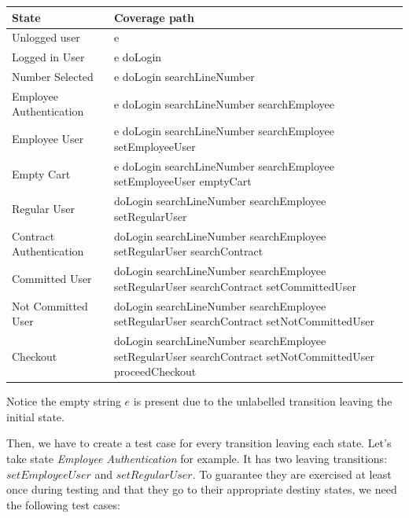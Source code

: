\begin{center}
\begin{tabular}{| l | p{10cm}|}

\hline

State & Coverage path \\ \hline

Unlogged user & e \\ \hline

Logged in User & e doLogin\\ \hline 

Number Selected & e doLogin searchLineNumber\\ \hline

Employee Authentication & e doLogin searchLineNumber searchEmployee\\ \hline

Employee User & e doLogin searchLineNumber searchEmployee setEmployeeUser \\ \hline

Empty Cart & e doLogin searchLineNumber searchEmployee setEmployeeUser emptyCart \\ \hline

Regular User & doLogin searchLineNumber searchEmployee setRegularUser \\ \hline

Contract Authentication & doLogin searchLineNumber searchEmployee setRegularUser searchContract \\ \hline

Committed User & doLogin searchLineNumber searchEmployee setRegularUser searchContract setCommittedUser \\ \hline

Not Committed User & doLogin searchLineNumber searchEmployee setRegularUser searchContract setNotCommittedUser \\ \hline

Checkout & doLogin searchLineNumber searchEmployee setRegularUser searchContract setNotCommittedUser proceedCheckout\\
\hline
\end{tabular}
\end{center}

Notice the empty string $e$ is present due to the unlabelled transition leaving the initial state.

Then, we have to create a test case for every transition leaving each state. Let's take state \textit{Employee Authentication} for example. It has two leaving transitions: $setEmployeeUser$ and $setRegularUser$. To guarantee they are exercised at least once during testing and that they go to their appropriate destiny states, we need the following test cases:

